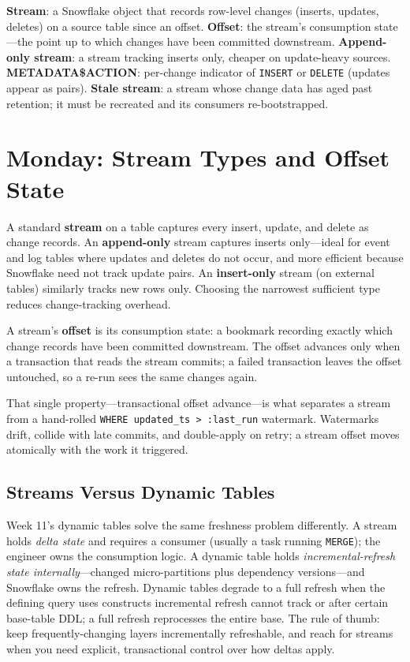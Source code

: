 \begin{keyterms}
\textbf{Stream}: a Snowflake object that records row-level changes (inserts, updates, deletes) on a source table since an offset.\quad
\textbf{Offset}: the stream's consumption state---the point up to which changes have been committed downstream.\quad
\textbf{Append-only stream}: a stream tracking inserts only, cheaper on update-heavy sources.\quad
\textbf{METADATA\$ACTION}: per-change indicator of \texttt{INSERT} or \texttt{DELETE} (updates appear as pairs).\quad
\textbf{Stale stream}: a stream whose change data has aged past retention; it must be recreated and its consumers re-bootstrapped.
\end{keyterms}

\section{Monday: Stream Types and Offset State}
A standard \textbf{stream} on a table captures every insert, update, and delete as change records. An \textbf{append-only} stream captures inserts only---ideal for event and log tables where updates and deletes do not occur, and more efficient because Snowflake need not track update pairs. An \textbf{insert-only} stream (on external tables) similarly tracks new rows only. Choosing the narrowest sufficient type reduces change-tracking overhead.

\begin{definitionbox}
A stream's \textbf{offset} is its consumption state: a bookmark recording exactly which change records have been committed downstream. The offset advances only when a transaction that reads the stream commits; a failed transaction leaves the offset untouched, so a re-run sees the same changes again.
\end{definitionbox}

That single property---transactional offset advance---is what separates a stream from a hand-rolled \texttt{WHERE updated\_ts > :last\_run} watermark. Watermarks drift, collide with late commits, and double-apply on retry; a stream offset moves atomically with the work it triggered.

\subsection{Streams Versus Dynamic Tables}
Week 11's dynamic tables solve the same freshness problem differently. A stream holds \emph{delta state} and requires a consumer (usually a task running \texttt{MERGE}); the engineer owns the consumption logic. A dynamic table holds \emph{incremental-refresh state internally}---changed micro-partitions plus dependency versions---and Snowflake owns the refresh. Dynamic tables degrade to a full refresh when the defining query uses constructs incremental refresh cannot track or after certain base-table DDL; a full refresh reprocesses the entire base. The rule of thumb: keep frequently-changing layers incrementally refreshable, and reach for streams when you need explicit, transactional control over how deltas apply.

